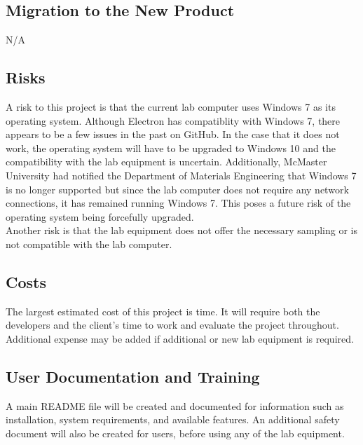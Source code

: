 \documentclass[12pt, titlepage]{article}
\begin{document}
\subsection{Migration to the New Product}
N/A

\subsection{Risks}
A risk to this project is that the current lab computer uses Windows 7 as its operating system. Although Electron has compatiblity with Windows 7, there appears to be a few issues in the past on GitHub. 
In the case that it does not work, the operating system will have to be upgraded to Windows 10 and the compatibility with the lab equipment is uncertain. Additionally, McMaster University had notified the 
Department of Materials Engineering that Windows 7 is no longer supported but since the lab computer does not require any network connections, it has remained running Windows 7. This poses a future risk of 
the operating system being forcefully upgraded.\\

Another risk is that the lab equipment does not offer the necessary sampling or is not compatible with the lab computer. 

\subsection{Costs}
The largest estimated cost of this project is time. It will require both the developers and the client's time to work and evaluate the project throughout.
Additional expense may be added if additional or new lab equipment is required. 

\subsection{User Documentation and Training}
A main README file will be created and documented for information such as installation, system requirements, and available features. 
An additional safety document will also be created for users, before using any of the lab equipment. 
\end{document}
